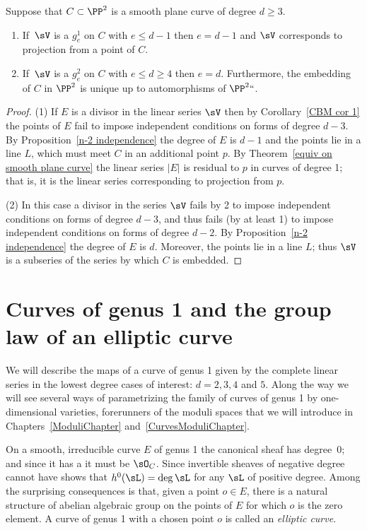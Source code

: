 \begin{corollary}\label{CBM cor 2}
 Suppose that $C\subset \PP^2$ is a smooth plane curve of degree $d\geq 3$.
 
\begin{enumerate}
 \item If $\,\sV$ is a $g^1_e$ on $C$ with $e\leq d-1$ then $e = d-1$ and $\sV$
 corresponds to projection from a point of $C$.
 \item If $\,\sV$ is a $g^2_e$ on $C$ with $e\leq d \geq 4$ then $e = d$. Furthermore,  the
  embedding of $C$ in $\PP^2$ is unique up to automorphisms of $\PP^2` `$.
 \end{enumerate}
\end{corollary}

\begin{proof}
(1) If $E$ is a divisor in the linear series $\sV$ then by Corollary~\ref{CBM cor 1} the points of $E$ fail to impose
 independent conditions on forms of degree $d-3$. By Proposition~\ref{n-2 independence} the degree of $E$ is $d-1$
 and the points lie in a line $L$, which must meet $C$ in an additional point $p$. By Theorem~\ref{equiv on smooth plane curve}
 the linear series $|E|$ is residual to $p$ in curves of degree 1; that is, it is the linear series corresponding to projection from $p$.
 
(2) In this case a divisor in the series $\sV$ fails by 2 to impose independent conditions on forms of degree $d-3$, and
 thus fails (by at least 1) to impose independent conditions on forms of degree $d-2$. By 
  Proposition~\ref{n-2 independence} the degree of $E$ is $d$.
 Moreover, the points lie in a line $L$; thus $\sV$ is a subseries of the series by which $C$ is embedded.
 \end{proof}

\section{Curves of genus 1 and the group law of an elliptic curve}

We will describe the maps of a curve of genus 1 given by
the complete linear series in the lowest degree cases of interest: $d =  2, 3, 4$ and $5$. Along the
way we will see several ways of parametrizing the family of curves of genus 1 by one-dimensional varieties,
%
forerunners of the moduli spaces that we will introduce in Chapters~\ref{ModuliChapter} and~\ref{CurvesModuliChapter}.


On a smooth, irreducible curve $E$ of genus 1 the canonical sheaf has degree~0;
and since it has a 
%
it must be $\sO_C$.
Since invertible sheaves of negative degree cannot have 
%
shows that
$h^0( \sL) = \deg \sL$ for any $\sL$ of positive degree. Among the surprising consequences is that, given
%
a point $o\in E$, there is a natural structure of abelian algebraic group on the points of $E$ for which $o$
is the zero element. A curve of genus 1 with a chosen point $o$ is called an \emph{elliptic curve}.
%

